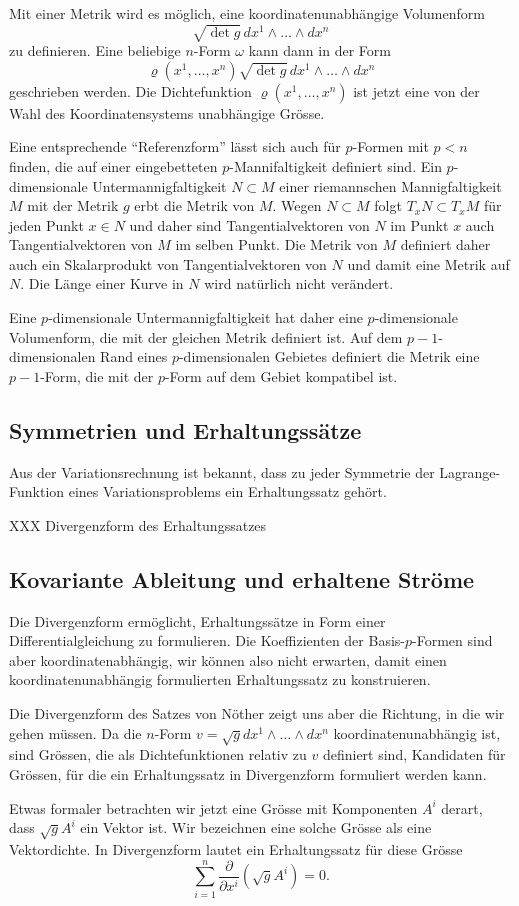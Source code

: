 Mit einer Metrik wird es möglich, eine koordinatenunabhängige Volumenform
\[
\sqrt{\det g}
\,dx^1\wedge\dots\wedge dx^n
\]
zu definieren.
Eine beliebige $n$-Form $\omega$ kann dann in der Form
\[
\varrho(x^1,\dots,x^n)
\sqrt{\det g}
\,dx^1\wedge \dots \wedge dx^n
\]
geschrieben werden.
Die Dichtefunktion $\varrho(x^1,\dots,x^n)$ ist jetzt eine von der
Wahl des Koordinatensystems unabhängige Grösse.

Eine entsprechende ``Referenzform'' lässt sich auch für $p$-Formen mit
$p<n$ finden, die auf einer eingebetteten $p$-Mannifaltigkeit
definiert sind.
Ein $p$-dimensionale Untermannigfaltigkeit $N\subset M$ einer
riemannschen Mannigfaltigkeit $M$ mit der Metrik $g$ erbt die Metrik
von $M$.
Wegen $N\subset M$ folgt $T_xN\subset T_xM$ für jeden Punkt $x\in N$
und daher sind Tangentialvektoren von $N$ im Punkt $x$ auch
Tangentialvektoren von $M$ im selben Punkt.
Die Metrik von $M$ definiert daher auch ein Skalarprodukt von
Tangentialvektoren von $N$ und damit eine Metrik auf $N$.
Die Länge einer Kurve in $N$ wird natürlich nicht verändert.

Eine $p$-dimensionale Untermannigfaltigkeit hat daher eine $p$-dimensionale
Volumenform, die mit der gleichen Metrik definiert ist.
Auf dem $p-1$-dimensionalen Rand eines $p$-dimensionalen Gebietes definiert
die Metrik eine $p-1$-Form, die mit der $p$-Form auf dem Gebiet kompatibel
ist.

%
%
\subsection{Symmetrien und Erhaltungssätze
\label{buch:zusammenhang:divergenz:subsection:noether}}
Aus der Variationsrechnung \cite[Abschnitt 10.2]{buch:seminarvariation}
ist bekannt, dass zu jeder Symmetrie der Lagrange-Funktion eines
Variationsproblems ein Erhaltungssatz gehört.

XXX Divergenzform des Erhaltungssatzes

%
%
\subsection{Kovariante Ableitung und erhaltene Ströme
\label{buch:zusammenhang:divergenz:subsetion:kovariant}}
Die Divergenzform ermöglicht, Erhaltungssätze in Form einer 
Differentialgleichung zu formulieren.
Die Koeffizienten der Basis-$p$-Formen sind aber koordinatenabhängig,
wir können also nicht erwarten, damit einen koordinatenunabhängig
formulierten Erhaltungssatz zu konstruieren.

Die Divergenzform des Satzes von Nöther zeigt uns aber die Richtung,
in die wir gehen müssen.
Da die $n$-Form $v=\sqrt{g} dx^1\wedge \dots\wedge dx^n$
koordinatenunabhängig ist, sind Grössen, die als Dichtefunktionen
relativ zu $v$ definiert sind, Kandidaten für Grössen, für die
ein Erhaltungssatz in Divergenzform formuliert werden kann.

Etwas formaler betrachten wir jetzt eine Grösse mit Komponenten $A^i$
derart, dass $\sqrt{g}A^i$ ein Vektor ist.
Wir bezeichnen eine solche Grösse als eine Vektordichte.
In Divergenzform lautet ein Erhaltungssatz für diese Grösse
\[
\sum_{i=1}^n \frac{\partial}{\partial x^i} (\!\sqrt{g}A^i)
=
0.
\]
